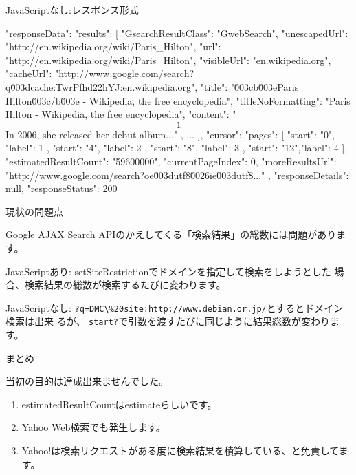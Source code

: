 \begin{frame}[containsverbatim]{JavaScriptなし:レスポンス形式}

\begin{commandline}
{"responseData": {
"results": [
 {
  "GsearchResultClass": "GwebSearch",
  "unescapedUrl": "http://en.wikipedia.org/wiki/Paris_Hilton",
  "url": "http://en.wikipedia.org/wiki/Paris_Hilton",
  "visibleUrl": "en.wikipedia.org",
  "cacheUrl": "http://www.google.com/search?q\u003dcache:TwrPfhd22hYJ:en.wikipedia.org",
  "title": "\u003cb\u003eParis Hilton\u003c/b\u003e - Wikipedia, the free encyclopedia",
  "titleNoFormatting": "Paris Hilton - Wikipedia, the free encyclopedia",
  "content": "\[1\] In 2006, she released her debut album..."
 },
 ...
],
"cursor": {
 "pages": [
  { "start": "0", "label": 1 },
  { "start": "4", "label": 2 },
  { "start": "8", "label": 3 },
  { "start": "12","label": 4 }
 ],
 "estimatedResultCount": "59600000",
 "currentPageIndex": 0,
 "moreResultsUrl": "http://www.google.com/search?oe\u003dutf8\u0026ie\u003dutf8..."
}
}
, "responseDetails": null, "responseStatus": 200}
\end{commandline}

\end{frame}

\begin{frame}[containsverbatim]{現状の問題点}

 Google AJAX Search APIのかえしてくる「検索結果」の総数には問題があります。

 JavaScriptあり:
 setSiteRestrictionでドメインを指定して検索をしようとした
 場合、検索結果の総数が検索するたびに変わります。

 JavaScriptなし:
 \verb!?q=DMC\%20site:http://www.debian.or.jp/!とするとドメイン検索は出来
 るが、
 \verb!start?!で引数を渡すたびに同じように結果総数が変わります。

\end{frame}

\begin{frame}{まとめ}

当初の目的は達成出来ませんでした。

\begin{enumerate}
\item estimatedResultCountはestimateらしいです。
\item Yahoo Web検索でも発生します。
\item Yahoo!は検索リクエストがある度に検索結果を積算している、と免責してます。
\end{enumerate}

\end{frame}

